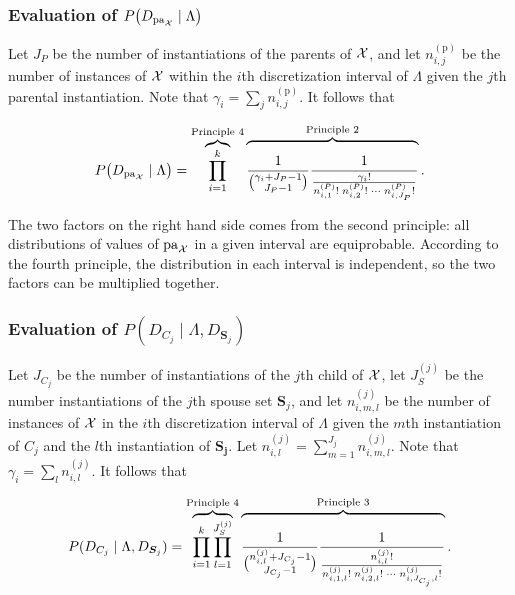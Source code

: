 \subsubsection{Evaluation of $P\paren{D_{\Pa_{\cX}} \mid \Lambda}$}

Let $J_P$ be the number of instantiations of the parents of $\mathcal{X}$, and let $n^{(\text{p})}_{i,j}$ be the number of instances of $\mathcal{X}$ within the $i$th discretization interval of $\Lambda$ given the $j$th parental instantiation.
Note that $\gamma_i = \sum_j n^{(\text{p})}_{i,j}$.
It follows that

\begin{equation}
  \label{eq:likelihood_one}
  P\paren{D_{\Pa_{\cX}} \mid \Lambda} = \overbrace{\prod_{i=1}^k}^{\text{Principle 4}}
    \overbrace{\rule{0pt}{2em}
      \frac{1}{{{\gamma_i + J_P - 1}\choose{J_P - 1}}}
      \frac{1}{
        \frac{
          {\gamma_i}!
        }{
          {n^{({P})}_{i,1}}! \; {n^{({P})}_{i,2}}! \; \cdots \; {n^{({P})}_{i,J_P}}!
        }
      }
    }^{\text{Principle 2}}\text{.}
\end{equation}

The two factors on the right hand side comes from the second principle: all distributions of values of $\operatorname{pa}_{\mathcal{X}}$ in a given interval are equiprobable.
According to the fourth principle, the distribution in each interval is independent, so the two factors can be multiplied together.

\subsubsection{Evaluation of $P(D_{C_j} \mid \Lambda, D_{\bm{S}_j})$}
Let $J_{C_j}$ be the number of instantiations of the $j$th child of $\mathcal{X}$, let $J_S^{(j)}$ be the number instantiations of the $j$th spouse set $\bm{S}_j$, and let $n^{(j)}_{i,m,l}$ be the number of instances of $\mathcal{X}$ in the $i$th discretization interval of $\Lambda$ given the $m$th instantiation of $C_j$ and the $l$th instantiation of $\boldsymbol{S_j}$.
Let ${n^{(j)}_{i,l} = \sum_{m=1}^{J_j} n^{(j)}_{i,m,l}}$.
Note that ${\gamma_i = \sum_l n^{(j)}_{i,l}}$.
It follows that

\begin{equation}
  \label{eq:likelihood_two}
  P(D_{C_j} \mid \Lambda, D_{\bm{S}_j}) =
  \overbrace{\prod_{i=1}^{k} \prod_{l=1}^{J_S^{(j)}}}^{\text{Principle 4}}
    \overbrace{\rule{0pt}{2.3em}
      {
        \frac{1}{
          {{n^{(j)}_{i,l} + J_{C_j} - 1}\choose{J_{C_j}-1}}}
        }
        {\frac{
          1
        }{
          \frac{
            {n^{(j)}_{i,l}}!
          }{
            {n^{(j)}_{i,1,l}!} \; {n^{(j)}_{i,2,l}!} \; \cdots \; {n^{(j)}_{i,J_{C_j},l}!}
          }
        }
      }
    }^{\text{Principle 3}}
    \text{.}
\end{equation}

